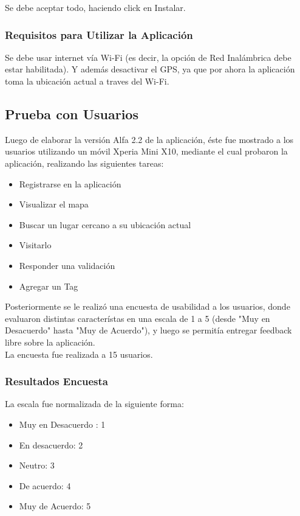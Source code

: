 \documentclass[10pt,letterpaper]{article}
\begin{document}
Se debe aceptar todo, haciendo click en Instalar.

\subsubsection{Requisitos para Utilizar la Aplicación}

Se debe usar internet vía Wi-Fi (es decir, la opción de Red Inalámbrica debe estar habilitada). Y además desactivar el GPS, ya que por ahora la aplicación toma la ubicación actual a traves del Wi-Fi.

\subsection{Prueba con Usuarios}

Luego de elaborar la versión Alfa 2.2 de la aplicación, éste fue mostrado a los usuarios utilizando un móvil Xperia Mini X10, mediante el cual probaron la aplicación, realizando las siguientes tareas:\\

\begin{itemize}
 \item Registrarse en la aplicación
 \item Visualizar el mapa
 \item Buscar un lugar cercano a su ubicación actual
 \item Visitarlo
 \item Responder una validación
 \item Agregar un Tag
\end{itemize}


Posteriormente se le realizó una encuesta de usabilidad a los usuarios, donde evaluaron distintas característas en una escala de 1 a 5 (desde "Muy en Desacuerdo" hasta "Muy de Acuerdo"), y luego se permitía entregar feedback libre sobre la aplicación.\\

La encuesta fue realizada a 15 usuarios.\\

\subsubsection{Resultados Encuesta}

La escala fue normalizada de la siguiente forma:

\begin{itemize}
\item Muy en Desacuerdo : 1
\item En desacuerdo: 2
\item Neutro: 3
\item De acuerdo: 4
\item Muy de Acuerdo: 5
\end{itemize}
\end{document}
